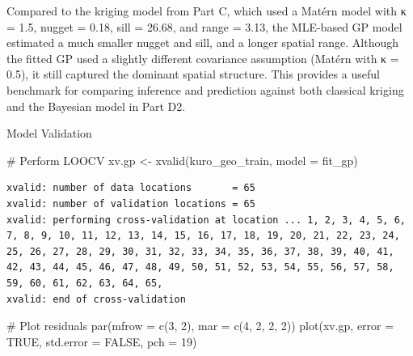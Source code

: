 \documentclass[
  11pt,
]{article}
\newenvironment{Shaded}{\begin{snugshade}}{\end{snugshade}}
\newcommand{\AttributeTok}[1]{\textcolor[rgb]{0.40,0.45,0.13}{#1}}
\newcommand{\CommentTok}[1]{\textcolor[rgb]{0.37,0.37,0.37}{#1}}
\newcommand{\ConstantTok}[1]{\textcolor[rgb]{0.56,0.35,0.01}{#1}}
\newcommand{\DecValTok}[1]{\textcolor[rgb]{0.68,0.00,0.00}{#1}}
\newcommand{\FunctionTok}[1]{\textcolor[rgb]{0.28,0.35,0.67}{#1}}
\newcommand{\NormalTok}[1]{\textcolor[rgb]{0.00,0.23,0.31}{#1}}
\newcommand{\OtherTok}[1]{\textcolor[rgb]{0.00,0.23,0.31}{#1}}
\begin{document}
Compared to the kriging model from Part C, which used a Matérn model
with κ = 1.5, nugget = 0.18, sill = 26.68, and range = 3.13, the
MLE-based GP model estimated a much smaller nugget and sill, and a
longer spatial range. Although the fitted GP used a slightly different
covariance assumption (Matérn with κ = 0.5), it still captured the
dominant spatial structure. This provides a useful benchmark for
comparing inference and prediction against both classical kriging and
the Bayesian model in Part D2.

Model Validation

\begin{Shaded}
\begin{Highlighting}[]
\CommentTok{\# Perform LOOCV}
\NormalTok{xv.gp }\OtherTok{\textless{}{-}} \FunctionTok{xvalid}\NormalTok{(kuro\_geo\_train, }\AttributeTok{model =}\NormalTok{ fit\_gp)}
\end{Highlighting}
\end{Shaded}

\begin{verbatim}
xvalid: number of data locations       = 65
xvalid: number of validation locations = 65
xvalid: performing cross-validation at location ... 1, 2, 3, 4, 5, 6, 7, 8, 9, 10, 11, 12, 13, 14, 15, 16, 17, 18, 19, 20, 21, 22, 23, 24, 25, 26, 27, 28, 29, 30, 31, 32, 33, 34, 35, 36, 37, 38, 39, 40, 41, 42, 43, 44, 45, 46, 47, 48, 49, 50, 51, 52, 53, 54, 55, 56, 57, 58, 59, 60, 61, 62, 63, 64, 65, 
xvalid: end of cross-validation
\end{verbatim}

\begin{Shaded}
\begin{Highlighting}[]
\CommentTok{\# Plot residuals}
\FunctionTok{par}\NormalTok{(}\AttributeTok{mfrow =} \FunctionTok{c}\NormalTok{(}\DecValTok{3}\NormalTok{, }\DecValTok{2}\NormalTok{), }\AttributeTok{mar =} \FunctionTok{c}\NormalTok{(}\DecValTok{4}\NormalTok{, }\DecValTok{2}\NormalTok{, }\DecValTok{2}\NormalTok{, }\DecValTok{2}\NormalTok{))}
\FunctionTok{plot}\NormalTok{(xv.gp, }\AttributeTok{error =} \ConstantTok{TRUE}\NormalTok{, }\AttributeTok{std.error =} \ConstantTok{FALSE}\NormalTok{, }\AttributeTok{pch =} \DecValTok{19}\NormalTok{)}
\end{Highlighting}
\end{Shaded}
\end{document}
